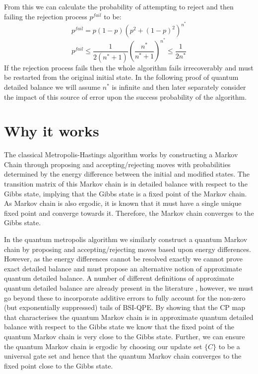 \documentclass[aps,floatfix,10pt,amssymb,amsfont,amsmath,superscriptaddress,float,nofootinbib,longbibliography,nobalancelastpage,twocolumn]{revtex4-2}
\begin{document}
From this we can calculate the probability of attempting to reject and then failing the rejection process $p^{fail}$ to be:
\begin{equation}
   p^{fail} =  p(1-p)(p^2 +(1-p)^2)^{n^*} 
\end{equation}
\begin{equation}
    \label{eq:probabilty_of_rejection}
   p^{fail} \leq \frac{1}{2(n^*+1)} \left(\frac{n^*}{n^*+1}\right)^{n^*} \leq \frac{1}{2n^*}
\end{equation}
If the rejection process fails then the whole algorithm fails irrecoverably and must be restarted from the original initial state. In the following proof of quantum detailed balance we will assume $n^*$ is infinite and then later separately consider the impact of this source of error upon the success probability of the algorithm.

\label{section:rejection}

\section{Why it works}
\label{section:why}
The classical Metropolis-Hastings algorithm works by constructing a Markov Chain through proposing and accepting/rejecting moves with probabilities determined by the energy difference between the initial and modified states. The transition matrix of this Markov chain is in detailed balance with respect to the Gibbs state, implying that the Gibbs state is a fixed point of the Markov chain. As Markov chain is also ergodic, it is known that it must have a single unique fixed point and converge towards it. Therefore, the Markov chain converges to the Gibbs state.

In the quantum metropolis algorithm we similarly construct a quantum Markov chain by proposing and accepting/rejecting moves based upon energy differences. However, as the energy differences cannot be resolved exactly we cannot prove exact detailed balance and must propose an alternative notion of approximate quantum detailed balance. A number of different definitions of approximate quantum detailed balance are already present in the literature \cite{}, however, we must go beyond these to incorporate additive errors to fully account for the non-zero (but exponentially suppressed) tails of BSI-QPE. By showing that the CP map that characterises the quantum Markov chain is in approximate quantum detailed balance with respect to the Gibbs state we know that the fixed point of the quantum Markov chain is very close to the Gibbs state. Further, we can ensure the quantum Markov chain is ergodic by choosing our update set $\{C\}$ to be a universal gate set \cite{Temme_2011} and hence that the quantum Markov chain converges to the fixed point close to the Gibbs state.
\end{document}
